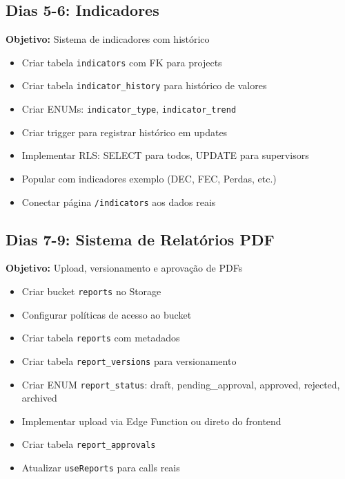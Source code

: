 \documentclass[12pt,a4paper]{article}
\newcommand{\checkbox}{$\square$}
\begin{document}
\subsection{Dias 5-6: Indicadores}

\begin{tcolorbox}[colback=green!5!white,colframe=neogreen]
\textbf{Objetivo:} Sistema de indicadores com histórico
\end{tcolorbox}

\begin{itemize}[label=\checkbox]
    \item Criar tabela \texttt{indicators} com FK para projects
    \item Criar tabela \texttt{indicator\_history} para histórico de valores
    \item Criar ENUMs: \texttt{indicator\_type}, \texttt{indicator\_trend}
    \item Criar trigger para registrar histórico em updates
    \item Implementar RLS: SELECT para todos, UPDATE para supervisors
    \item Popular com indicadores exemplo (DEC, FEC, Perdas, etc.)
    \item Conectar página \texttt{/indicators} aos dados reais
\end{itemize}

\subsection{Dias 7-9: Sistema de Relatórios PDF}

\begin{tcolorbox}[colback=green!5!white,colframe=neogreen]
\textbf{Objetivo:} Upload, versionamento e aprovação de PDFs
\end{tcolorbox}

\begin{itemize}[label=\checkbox]
    \item Criar bucket \texttt{reports} no Storage
    \item Configurar políticas de acesso ao bucket
    \item Criar tabela \texttt{reports} com metadados
    \item Criar tabela \texttt{report\_versions} para versionamento
    \item Criar ENUM \texttt{report\_status}: draft, pending\_approval, approved, rejected, archived
    \item Implementar upload via Edge Function ou direto do frontend
    \item Criar tabela \texttt{report\_approvals}
    \item Atualizar \texttt{useReports} para calls reais
\end{itemize}
\end{document}
